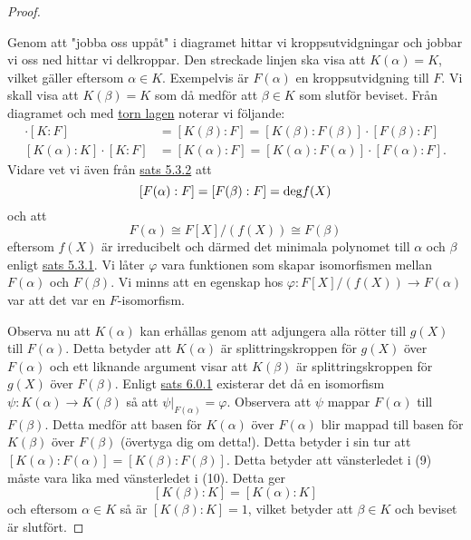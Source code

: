 \documentclass{article}
\newcommand{\grad}[0]{\textnormal{deg}}
\theoremstyle{definition}
\begin{document}
\begin{proof}
\begin{center}
  \end{center}
  Genom att "jobba oss uppåt" i diagramet hittar vi kroppsutvidgningar och jobbar vi oss ned hittar vi delkroppar. 
  Den streckade linjen ska visa att $K(\alpha) = K$, vilket gäller eftersom $\alpha \in K.$
  Exempelvis är $F(\alpha)$ en kroppsutvidgning 
  till $F$. Vi skall visa att $K(\beta) = K$ som då medför att $\beta \in K$ som slutför beviset. Från diagramet och med \hyperlink{torn lagen}{torn lagen}
  noterar vi följande:
  \begin{align}
    [K(\beta): K] \cdot [K:F] &= [K(\beta): F] = [K(\beta): F(\beta)] \cdot [F(\beta): F] \\
    [K(\alpha): K] \cdot [K:F] &= [K(\alpha): F] = [K(\alpha): F(\alpha)] \cdot [F(\alpha): F].
  \end{align}
  Vidare vet vi även från \hyperlink{5.3.2}{sats 5.3.2} att
  \[[F(\alpha): F] = [F(\beta):F] = \grad f(X)\]
  och att
  \[F(\alpha) \cong F[X]/(f(X)) \cong F(\beta)\]
  eftersom $f(X)$ är irreducibelt och därmed det minimala polynomet till $\alpha$ och $\beta$ enligt \hyperlink{minpol}{sats 5.3.1}. Vi låter 
  $\varphi$ vara funktionen som skapar isomorfismen mellan $F(\alpha)$ och $F(\beta)$. 
  Vi minns att en egenskap hos $\varphi: F[X]/(f(X)) \rightarrow F(\alpha)$ var att det var en $F$-isomorfism.

  Observa nu att $K(\alpha)$ kan erhållas genom att adjungera alla rötter till $g(X)$ till $F(\alpha)$. Detta betyder att 
  $K(\alpha)$ är splittringskroppen för $g(X)$ över $F(\alpha)$ och ett liknande argument visar att $K(\beta)$ är splittringskroppen för 
  $g(X)$ över $F(\beta)$. Enligt \hyperlink{sats6.0.1}{sats 6.0.1} existerar det då en isomorfism $\psi: K(\alpha) \rightarrow K(\beta)$ 
  så att $\psi |_{F(\alpha)} = \varphi$. Observera att $\psi$ mappar $F(\alpha)$ till $F(\beta)$. Detta medför att basen för $K(\alpha)$
  över $F(\alpha)$ blir mappad till basen för $K(\beta)$ över $F(\beta)$ (övertyga dig om detta!). Detta betyder i sin tur att 
  $[K(\alpha):F(\alpha)] = [K(\beta): F(\beta)]$. Detta betyder att vänsterledet i (9) måste vara lika med vänsterledet i (10). Detta ger 
  \[[K(\beta): K] = [K(\alpha):K]\]
  och eftersom $\alpha \in K$ så är $[K(\beta):K] = 1$, vilket betyder att $\beta \in K$ och beviset är slutfört. 
\end{proof}
\end{document}
